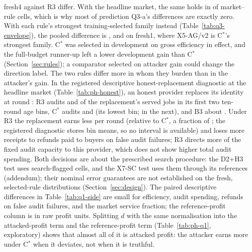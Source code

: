 \documentclass[11pt]{article}
\begin{document}
fresh4 against R3 differ. With the headline market, the same holds in  of  market--rule cells, which is why most of prediction Q3-a's differences are exactly zero. With each rule's strongest training-selected family instead (Table~\ref{tab:q3-envelope}), the pooled difference is , and  on fresh1, where X5-AG/v2 is C$^*$'s strongest family. C$^*$ was selected in development on gross efficiency in effect, and the full-budget runner-up left a lower development gain than C$^*$ (Section~\ref{sec:rules}); a comparator selected on attacker gain could change the direction label. The two rules differ more in whom they burden than in the attacker's gain. In the registered descriptive honest-replacement diagnostic at the headline market (Table~\ref{tab:ph-honest}), an honest provider replaces its identity at round : R3 audits  and  of the replacement's served jobs in its first two ten-round age bins, C$^*$ audits  and  (its lowest bin;  in the next), and B3 about . Under R3 the replacement earns less per round (relative to C$^*$, a fraction of ; the registered diagnostic stores bin means, so no interval is available) and loses more receipts to refunds paid to buyers on false audit failures; R3 directs more of the fixed audit capacity to this provider, which does not show higher total audit spending. Both decisions are about the prescribed search procedure: the D2+H3 test uses search-flagged cells, and the X7-SC test uses them through its references (addendum); their nominal error guarantees are not established on the fresh, selected-rule distributions (Section~\ref{sec:design}). The paired descriptive differences in Table~\ref{tab:q1-side} are small for efficiency, audit spending, refunds on false audit failures, and the market service fraction; the reference-profit column is in raw profit units. Splitting $d$ with the same normalisation into the attacked-profit term and the reference-profit term (Table~\ref{tab:ph-q1}, exploratory) shows that almost all of it is attacked profit: the attacker earns more under C$^*$ when it deviates, not when it is truthful.
\begin{table}[t]\centering\small
{}
\caption{Exploratory, after the report: the pooled Q1 difference split into the attacked-profit term and the reference-profit term, with the normalisation of the gain and equal market weights.}\label{tab:ph-q1}
\end{table}
\end{document}
